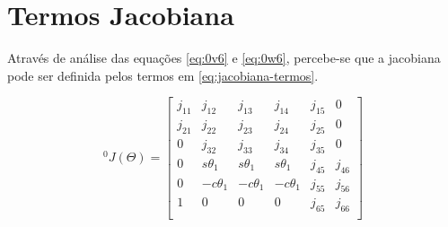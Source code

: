 
\section{Termos Jacobiana}
\label{AnexoJacobiana-SecTermos}

Através de análise das equações \ref{eq:0v6} e \ref{eq:0w6}, percebe-se que a jacobiana pode ser definida 
pelos termos em \ref{eq:jacobiana-termos}.

\begin{equation}
    \label{eq:jacobiana-termos}
    ^0J(\Theta) = 
    \begin{bmatrix}
        j_{11} & j_{12} & j_{13} & j_{14} & j_{15} & 0 \\
        j_{21} & j_{22} & j_{23} & j_{24} & j_{25} & 0 \\
        0 & j_{32} & j_{33} & j_{34} & j_{35} & 0 \\
        0 &  s\theta_1 &  s\theta_1 &  s\theta_1 & j_{45} & j_{46} \\
        0 & -c\theta_1 & -c\theta_1 & -c\theta_1 & j_{55} & j_{56} \\
        1 &   0  &   0  &   0  & j_{65} & j_{66} \\    
    \end{bmatrix}
\end{equation}

